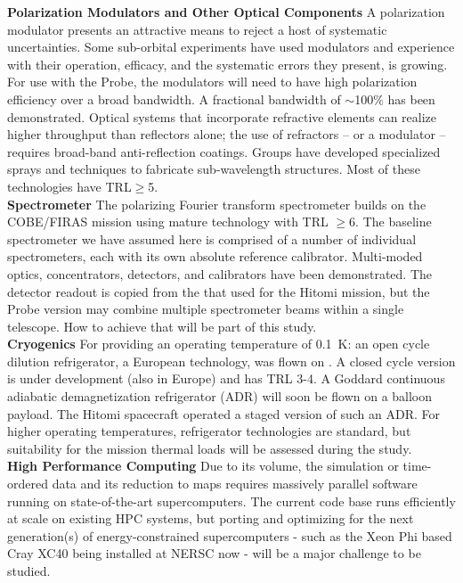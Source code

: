 {\bf Polarization Modulators and Other Optical Components}  \hspace{0.025in} A polarization modulator presents an attractive means to reject a host of systematic uncertainties. Some sub-orbital experiments have used modulators and experience with their operation, efficacy, and the systematic errors they present, is growing. For use with the Probe, the modulators will need to have high polarization efficiency over a broad bandwidth.  A fractional bandwidth of $\sim$100\% has been demonstrated. Optical systems that incorporate refractive elements can realize higher throughput than reflectors alone; the use of refractors -- or a modulator -- requires broad-band anti-reflection coatings. Groups have developed specialized sprays and techniques to fabricate sub-wavelength structures. Most of these technologies have TRL$\geq$5.  \\
{\bf Spectrometer} \hspace{0.025in} The polarizing Fourier transform spectrometer builds on the COBE/FIRAS mission using mature technology with TRL $\geq$6. The baseline spectrometer we have assumed here is comprised of a number of individual spectrometers, each with its own absolute reference calibrator. Multi-moded optics, concentrators, detectors, and calibrators have been demonstrated. The detector readout is copied from the 
that used for the Hitomi mission, but the Probe version may combine multiple spectrometer beams within a single telescope. 
How to achieve that will be part of this study. \\
{\bf Cryogenics }  \hspace{0.0025in} For providing an operating temperature of 0.1~K: an open cycle dilution refrigerator, a European technology, was flown on \planck. A closed cycle version is under development (also in Europe) and has TRL 3-4. A Goddard continuous adiabatic demagnetization refrigerator (ADR) will soon be flown on a balloon payload. The Hitomi spacecraft operated a staged version of such an ADR. For higher operating temperatures, refrigerator technologies are standard, but suitability for the mission thermal loads will be assessed during the study. \\
{\bf High Performance Computing} \hspace{0.0025in} Due to its volume, the simulation or time-ordered data and its reduction to maps requires massively parallel software running on state-of-the-art supercomputers. The current code base runs efficiently at scale on existing HPC systems, but porting and optimizing for the next generation(s) of energy-constrained supercomputers - such as the Xeon Phi based Cray XC40 being installed at NERSC now - will be a major challenge to be studied.



